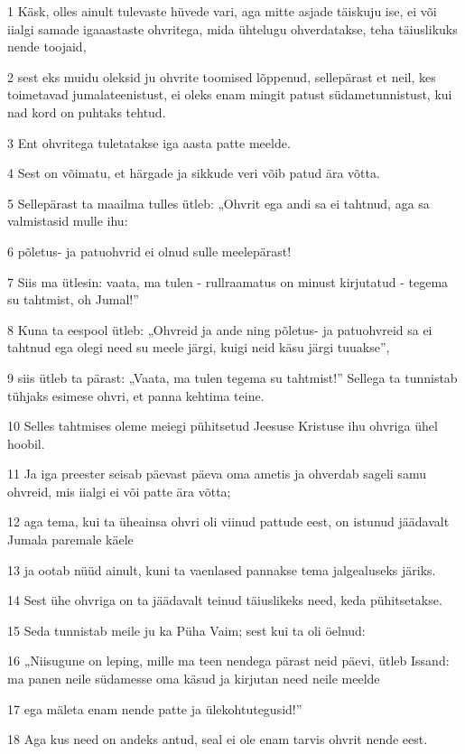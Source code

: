 \par 1 Käsk, olles ainult tulevaste hüvede vari, aga mitte asjade täiskuju ise, ei või iialgi samade igaaastaste ohvritega, mida ühtelugu ohverdatakse, teha täiuslikuks nende toojaid,
\par 2 sest eks muidu oleksid ju ohvrite toomised lõppenud, sellepärast et neil, kes toimetavad jumalateenistust, ei oleks enam mingit patust südametunnistust, kui nad kord on puhtaks tehtud.
\par 3 Ent ohvritega tuletatakse iga aasta patte meelde.
\par 4 Sest on võimatu, et härgade ja sikkude veri võib patud ära võtta.
\par 5 Sellepärast ta maailma tulles ütleb: „Ohvrit ega andi sa ei tahtnud, aga sa valmistasid mulle ihu:
\par 6 põletus- ja patuohvrid ei olnud sulle meelepärast!
\par 7 Siis ma ütlesin: vaata, ma tulen - rullraamatus on minust kirjutatud - tegema su tahtmist, oh Jumal!”
\par 8 Kuna ta eespool ütleb: „Ohvreid ja ande ning põletus- ja patuohvreid sa ei tahtnud ega olegi need su meele järgi, kuigi neid käsu järgi tuuakse”,
\par 9 siis ütleb ta pärast: „Vaata, ma tulen tegema su tahtmist!” Sellega ta tunnistab tühjaks esimese ohvri, et panna kehtima teine.
\par 10 Selles tahtmises oleme meiegi pühitsetud Jeesuse Kristuse ihu ohvriga ühel hoobil.
\par 11 Ja iga preester seisab päevast päeva oma ametis ja ohverdab sageli samu ohvreid, mis iialgi ei või patte ära võtta;
\par 12 aga tema, kui ta üheainsa ohvri oli viinud pattude eest, on istunud jäädavalt Jumala paremale käele
\par 13 ja ootab nüüd ainult, kuni ta vaenlased pannakse tema jalgealuseks järiks.
\par 14 Sest ühe ohvriga on ta jäädavalt teinud täiuslikeks need, keda pühitsetakse.
\par 15 Seda tunnistab meile ju ka Püha Vaim; sest kui ta oli öelnud:
\par 16 „Niisugune on leping, mille ma teen nendega pärast neid päevi, ütleb Issand: ma panen neile südamesse oma käsud ja kirjutan need neile meelde
\par 17 ega mäleta enam nende patte ja ülekohtutegusid!”
\par 18 Aga kus need on andeks antud, seal ei ole enam tarvis ohvrit nende eest.

